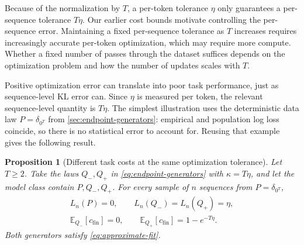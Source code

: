\documentclass[11pt,twoside]{article}
\newcommand{\E}{\mathbb E}
\newtheorem{proposition}[theorem]{Proposition}
\theoremstyle{definition}
\theoremstyle{remark}
\begin{document}
Because of the normalization by \(T\), a per-token tolerance \(\eta\)
only guarantees a per-sequence tolerance \(T\eta\).
Our earlier cost bounds motivate controlling the per-sequence error.
Maintaining a fixed per-sequence tolerance as \(T\) increases requires
increasingly accurate per-token optimization, which may require more
compute. Whether a fixed number of passes through the dataset suffices
depends on the optimization problem and how the number of updates
scales with \(T\).\label{en:optimization-compute}

Positive optimization error can translate into poor task performance,
just as sequence-level KL error can. Since \(\eta\) is measured per
token, the relevant sequence-level quantity is \(T\eta\).
The simplest illustration uses the deterministic data law
\(P=\delta_{0^T}\) from \cref{sec:endpoint-generators}: empirical and
population log loss coincide, so there is no statistical error to
account for. Reusing that example gives the following result.

\begin{proposition}[Different task costs at the same optimization tolerance]
\label{prop:endpoint-optimization}
Let \(T\ge2\). Take the laws \(Q_-,Q_+\) in \cref{eq:endpoint-generators} with
\(\kappa=T\eta\), and let the model class contain \(P,Q_-,Q_+\).
For every sample of \(n\) sequences from \(P=\delta_{0^T}\),
\begin{equation}
 \begin{gathered}
 L_n(P)=0,\qquad
 L_n(Q_-)=L_n(Q_+)=\eta,\\
 \E_{Q_-}[c_{\mathrm{fin}}]=0,\qquad
 \E_{Q_+}[c_{\mathrm{fin}}]=1-e^{-T\eta}.
 \end{gathered}
 \label{eq:endpoint-optimization}
\end{equation}
Both generators satisfy \cref{eq:approximate-fit}.
\end{proposition}
\end{document}
